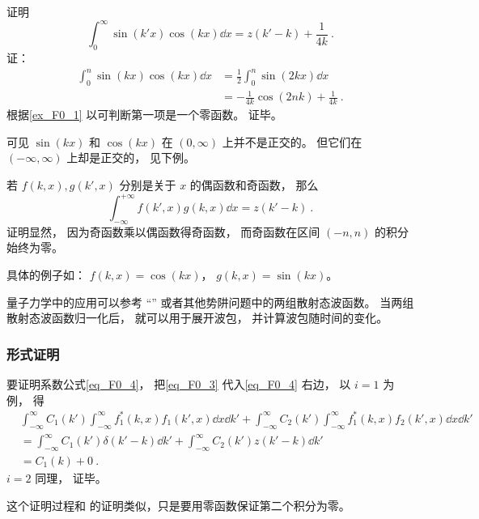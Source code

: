 \begin{example}{}
证明
\begin{equation}
\int_0^\infty \sin(k'x)\cos(kx) \dd{x} = z(k' - k) + \frac{1}{4k}~.
\end{equation}
证：
\begin{equation}
\begin{aligned}
\int_0^n \sin(kx)\cos(kx) \dd{x} &= \frac{1}{2} \int_0^n \sin(2kx) \dd{x}\\
&= -\frac{1}{4k}\cos(2nk) + \frac{1}{4k}~.
\end{aligned}
\end{equation}
根据\autoref{ex_F0_1} 以可判断第一项是一个零函数。 证毕。

可见 $\sin(kx)$ 和 $\cos(kx)$ 在 $(0,\infty)$ 上并不是正交的。 但它们在 $(-\infty, \infty)$ 上却是正交的， 见下例。
\end{example}

\begin{example}{}\label{ex_F0_2}
若 $f(k,x),g(k',x)$ 分别是关于 $x$ 的偶函数和奇函数， 那么
\begin{equation}
\int_{-\infty}^{+\infty} f(k', x) g(k, x) \dd{x} = z(k'-k)~.
\end{equation}
证明显然， 因为奇函数乘以偶函数得奇函数， 而奇函数在区间 $(-n, n)$ 的积分始终为零。

具体的例子如： $f(k,x) = \cos(kx)$， $g(k, x) = \sin(kx)$。
\end{example}

量子力学中的应用可以参考 “” 或者其他势阱问题中的两组散射态波函数。 当两组散射态波函数归一化后， 就可以用于展开波包， 并计算波包随时间的变化。

\subsubsection{形式证明}
要证明系数公式\autoref{eq_F0_4}， 把\autoref{eq_F0_3} 代入\autoref{eq_F0_4} 右边， 以 $i = 1$ 为例， 得
\begin{equation}
\begin{aligned}
&\int_{-\infty}^{\infty} C_1(k') \int_{-\infty}^{\infty} f_1^*(k, x) f_1(k', x)\dd{x} \dd{k'} + \int_{-\infty}^{\infty} C_2(k') \int_{-\infty}^{\infty} f_1^*(k, x)f_2(k', x)\dd{x} \dd{k'}\\
&= \int_{-\infty}^{\infty} C_1(k') \delta(k' - k) \dd{k'} + \int_{-\infty}^{\infty} C_2(k') z(k' - k) \dd{k'}\\
&= C_1(k) + 0~.
\end{aligned}
\end{equation}
$i = 2$ 同理， 证毕。

这个证明过程和 的证明类似，只是要用零函数保证第二个积分为零。
